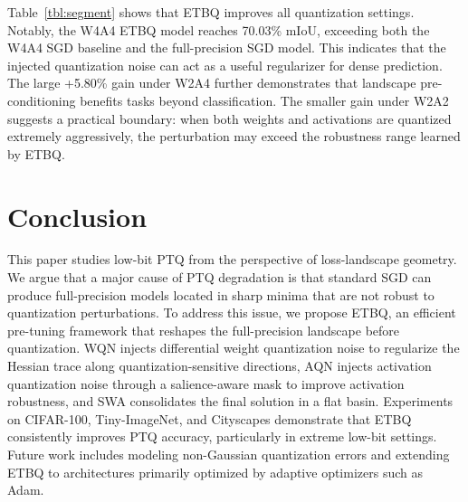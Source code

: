 \documentclass{article}
\begin{document}
\begin{table}[h!]
\centering
\caption{Semantic segmentation performance on Cityscapes. Results are mIoU (\%).}
\label{tbl:segment}
\end{table}

Table~\ref{tbl:segment} shows that ETBQ improves all quantization settings. Notably, the W4A4 ETBQ model reaches 70.03\% mIoU, exceeding both the W4A4 SGD baseline and the full-precision SGD model. This indicates that the injected quantization noise can act as a useful regularizer for dense prediction. The large +5.80\% gain under W2A4 further demonstrates that landscape pre-conditioning benefits tasks beyond classification. The smaller gain under W2A2 suggests a practical boundary: when both weights and activations are quantized extremely aggressively, the perturbation may exceed the robustness range learned by ETBQ.

\section{Conclusion}

This paper studies low-bit PTQ from the perspective of loss-landscape geometry. We argue that a major cause of PTQ degradation is that standard SGD can produce full-precision models located in sharp minima that are not robust to quantization perturbations. To address this issue, we propose ETBQ, an efficient pre-tuning framework that reshapes the full-precision landscape before quantization. WQN injects differential weight quantization noise to regularize the Hessian trace along quantization-sensitive directions, AQN injects activation quantization noise through a salience-aware mask to improve activation robustness, and SWA consolidates the final solution in a flat basin. Experiments on CIFAR-100, Tiny-ImageNet, and Cityscapes demonstrate that ETBQ consistently improves PTQ accuracy, particularly in extreme low-bit settings. Future work includes modeling non-Gaussian quantization errors and extending ETBQ to architectures primarily optimized by adaptive optimizers such as Adam.
\end{document}
